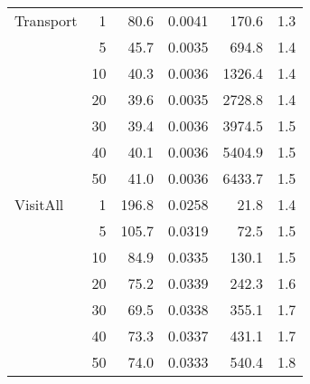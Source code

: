 \begin{table}[!h]
{\begin{tabular}{lrrrrr}
Transport & 1 &        80.6 &      0.0041 &               170.6 &                           1.3 \\
         & 5 &        45.7 &      0.0035 &               694.8 &                           1.4 \\
         & 10 &        40.3 &      0.0036 &              1326.4 &                           1.4 \\
         & 20 &        39.6 &      0.0035 &              2728.8 &                           1.4 \\
         & 30 &        39.4 &      0.0036 &              3974.5 &                           1.5 \\
         & 40 &        40.1 &      0.0036 &              5404.9 &                           1.5 \\
         & 50 &        41.0 &      0.0036 &              6433.7 &                           1.5 \\ \midrule
VisitAll & 1 &       196.8 &      0.0258 &                21.8 &                           1.4 \\
         & 5 &       105.7 &      0.0319 &                72.5 &                           1.5 \\
         & 10 &        84.9 &      0.0335 &               130.1 &                           1.5 \\
         & 20 &        75.2 &      0.0339 &               242.3 &                           1.6 \\
         & 30 &        69.5 &      0.0338 &               355.1 &                           1.7 \\
         & 40 &        73.3 &      0.0337 &               431.1 &                           1.7 \\
         & 50 &        74.0 &      0.0333 &               540.4 &                           1.8 \\
\bottomrule
\end{tabular}
}
\end{table}

